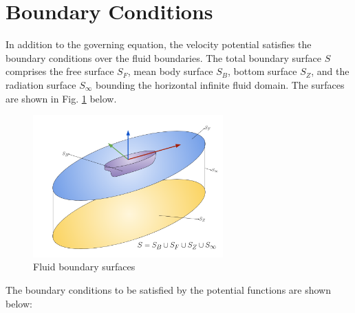 \section{Boundary Conditions}
\label{sec:Boundary condition}
In addition to the governing equation, the velocity potential satisfies the boundary conditions over the fluid boundaries. The total boundary surface $S$ comprises the free surface $S_F$, mean body surface $S_B$, bottom surface $S_Z$, and the radiation surface $S_\infty$ bounding the horizontal infinite fluid domain. The surfaces are shown in Fig. \ref{fig:boundary_surfaces} below.
\begin{figure}[H]
	\centering
	\includegraphics[width = 0.65\textwidth]{photos/boundary_surfaces.png}
	\caption{Fluid boundary surfaces}
	\label{fig:boundary_surfaces}
\end{figure}
The boundary conditions to be satisfied by the potential functions are shown below:

